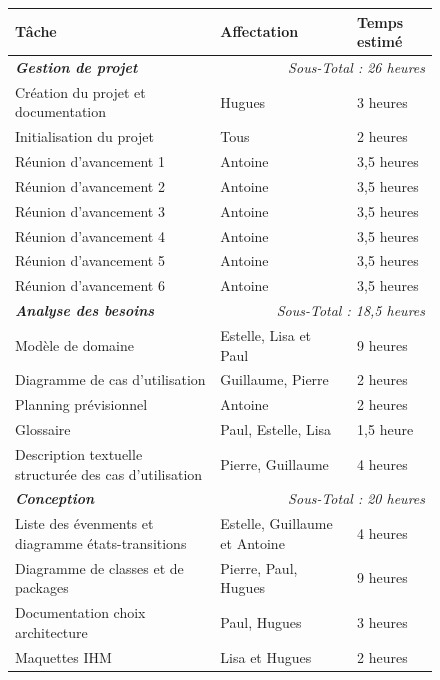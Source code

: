 \documentclass[paper=a4, fontsize=11pt]{report}
\numberwithin{equation}{section}		%
\numberwithin{figure}{section}		%
\numberwithin{table}{section}		%
\renewcommand{\bf}[1]{\textbf{#1}}
\renewcommand{\it}[1]{\textit{#1}}
\newcommand{\bfit}[1]{\textbf{\textit{#1}}}
\begin{document}
\begin{figure}[H]
\begin{center}
\begin{tabular}{ | l | l | l | }
  \hline
  \bf{Tâche} & \bf{Affectation} & \bf{Temps estimé} \\
  \hline
  \hline
  \bfit{Gestion de projet} & \multicolumn{2}{r|}{\it{Sous-Total : 26 heures}} \\
  \hline
  Création du projet et documentation & Hugues & 3 heures \\
  \hline
  Initialisation du projet & Tous & 2 heures \\
  \hline
  Réunion d'avancement 1 & Antoine & 3,5 heures \\
  \hline
  Réunion d'avancement 2 & Antoine & 3,5 heures \\
  \hline
  Réunion d'avancement 3 & Antoine & 3,5 heures \\
  \hline
  Réunion d'avancement 4 & Antoine & 3,5 heures \\
  \hline
  Réunion d'avancement 5 & Antoine & 3,5 heures \\
  \hline
  Réunion d'avancement 6 & Antoine & 3,5 heures \\
  \hline
  \hline
  \bfit{Analyse des besoins} & \multicolumn{2}{r|}{\it{Sous-Total : 18,5 heures}} \\
  \hline
  Modèle de domaine & Estelle, Lisa et Paul & 9 heures \\
  \hline
  Diagramme de cas d'utilisation & Guillaume, Pierre & 2 heures \\
  \hline
  Planning prévisionnel & Antoine & 2 heures \\
  \hline
  Glossaire & Paul, Estelle, Lisa & 1,5 heure \\
  \hline
  Description textuelle structurée des cas d'utilisation & Pierre, Guillaume & 4 heures \\
  \hline
  \hline
  \bfit{Conception} & \multicolumn{2}{r|}{\it{Sous-Total : 20 heures}} \\
  \hline
  Liste des évenments et diagramme états-transitions & Estelle, Guillaume et Antoine & 4 heures \\
  \hline
  Diagramme de classes et de packages & Pierre, Paul, Hugues & 9 heures \\
  \hline
  Documentation choix architecture & Paul, Hugues & 3 heures \\
  \hline
  Maquettes IHM & Lisa et Hugues & 2 heures \\

\end{tabular}
\end{center}
\end{figure}
\end{document}
